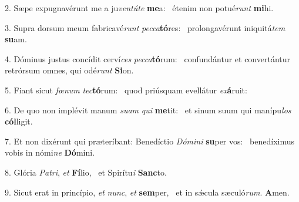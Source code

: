 2. Sæpe expugnavérunt me a ju\textit{ven}\textit{tú}\textit{te} \textbf{me}a: \ast\  étenim non potué\textit{runt} \textbf{mi}hi.\

3. Supra dorsum meum fabricavé\textit{runt} \textit{pec}\textit{ca}\textbf{tó}res: \ast\  prolongavérunt iniquitá\textit{tem} \textbf{su}am.\

4. Dóminus justus concídit cerví\textit{ces} \textit{pec}\textit{ca}\textbf{tó}rum: \ast\  confundántur et convertántur retrórsum omnes, qui odé\textit{runt} \textbf{Si}on.\

5. Fiant sicut \textit{fœ}\textit{num} \textit{tec}\textbf{tó}rum: \ast\  quod priúsquam evellátur \textit{ex}\textbf{á}ruit:\

6. De quo non implévit manum \textit{su}\textit{am} \textit{qui} \textbf{me}tit: \ast\  et sinum suum qui manípu\textit{los} \textbf{cól}ligit.\

7. Et non dixérunt qui præteríbant: Benedíctio \textit{Dó}\textit{mi}\textit{ni} \textbf{su}per vos: \ast\  benedíximus vobis in nómi\textit{ne} \textbf{Dó}mini.\

8. Glória \textit{Pa}\textit{tri}, \textit{et} \textbf{Fí}lio, \ast\  et Spirítu\textit{i} \textbf{Sanc}to.\

9. Sicut erat in princípio, \textit{et} \textit{nunc}, \textit{et} \textbf{sem}per, \ast\  et in sǽcula sæculó\textit{rum}. \textbf{A}men.\

